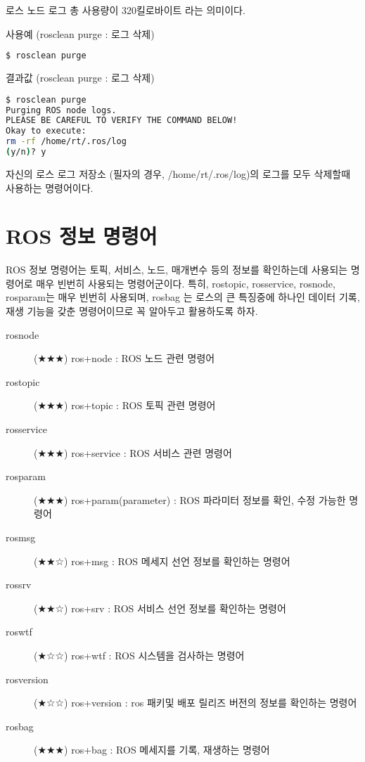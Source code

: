 \noindent
로스 노드 로그 총 사용량이 320킬로바이트 라는 의미이다.

\vspace{\baselineskip}
\noindent
{}\circled{\thenum} 사용예 (rosclean purge : 로그 삭제)
\begin{lstlisting}[language=bash]
$ rosclean purge
\end{lstlisting}

\noindent
{}\circled{\thenum} 결과값 (rosclean purge : 로그 삭제)
\begin{lstlisting}[language=bash]
$ rosclean purge 
Purging ROS node logs.
PLEASE BE CAREFUL TO VERIFY THE COMMAND BELOW!
Okay to execute:
rm -rf /home/rt/.ros/log
(y/n)? y
\end{lstlisting}

\noindent
자신의 로스 로그 저장소 (필자의 경우, /home/rt/.ros/log)의 로그를 모두 삭제할때 사용하는 명령어이다.

\section{ROS 정보 명령어}

ROS 정보 명령어는 토픽, 서비스, 노드, 매개변수 등의 정보를 확인하는데 사용되는 명령어로 매우 빈번히 사용되는 명령어군이다. 특히, rostopic, rosservice, rosnode, rosparam는 매우 빈번히 사용되며, rosbag 는 로스의 큰 특징중에 하나인 데이터 기록, 재생 기능을 갖춘 명령어이므로 꼭 알아두고 활용하도록 하자.

\vspace{\baselineskip}
\noindent
\begin{description}
\item[rosnode] (★★★) ros+node : ROS 노드 관련 명령어
\item[rostopic] (★★★) ros+topic : ROS 토픽 관련 명령어
\item[rosservice] (★★★) ros+service : ROS 서비스 관련 명령어
\item[rosparam] (★★★) ros+param(parameter) : ROS 파라미터 정보를 확인, 수정 가능한 명령어
\item[rosmsg] (★★☆) ros+msg : ROS 메세지 선언 정보를 확인하는 명령어
\item[rossrv] (★★☆) ros+srv : ROS 서비스 선언 정보를 확인하는 명령어
\item[roswtf] (★☆☆) ros+wtf : ROS 시스템을 검사하는 명령어
\item[rosversion] (★☆☆) ros+version : ros 패키및 배포 릴리즈 버전의 정보를 확인하는 명령어
\item[rosbag] (★★★) ros+bag : ROS 메세지를 기록, 재생하는 명령어
\end{description}

